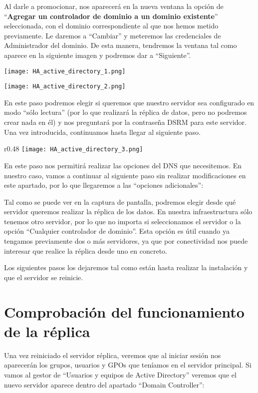 Al darle a promocionar, nos aparecerá en la nueva ventana la opción de “\textbf{Agregar un controlador de dominio a un dominio existente}” seleccionada, con el dominio correspondiente al que nos hemos metido previamente. Le daremos a “Cambiar” y meteremos las credenciales de Administrador del dominio. De esta manera, tendremos la ventana tal como aparece en la siguiente imagen y podremos dar a “Siguiente”.


{
    \begin{minipage}{0.48\linewidth}
        \texttt{[image: HA\_active\_directory\_1.png]}
    \end{minipage}
    \hfill
    \begin{minipage}{0.48\linewidth}
        \texttt{[image: HA\_active\_directory\_2.png]}
    \end{minipage}
    \vspace{1em}
}



En este paso podremos elegir si queremos que nuestro servidor sea configurado en modo “sólo lectura” (por lo que realizará la réplica de datos, pero no podremos crear nada en él) y nos preguntará por la contraseña DSRM para este servidor. Una vez introducida, continuamos hasta llegar al siguiente paso.

\begin{wrapfigure}{r}{0.48\linewidth}
    \centering
        \vspace{-10pt}
    \texttt{[image: HA\_active\_directory\_3.png]}
\end{wrapfigure}
En este paso nos permitirá realizar las opciones del DNS que necesitemos. En nuestro caso, vamos a continuar al siguiente paso sin realizar modificaciones en este apartado, por lo que llegaremos a las “opciones adicionales”:

Tal como se puede ver en la captura de pantalla, podremos elegir desde qué servidor queremos realizar la réplica de los datos. En nuestra infraestructura sólo tenemos otro servidor, por lo que no importa si seleccionamos el servidor o la opción “Cualquier controlador de dominio”. Esta opción es útil cuando ya tengamos previamente dos o más servidores, ya que por conectividad nos puede interesar que realice la réplica desde uno en concreto.

Los siguientes pasos los dejaremos tal como están hasta realizar la instalación y que el servidor se reinicie.

\section{Comprobación del funcionamiento de la réplica}
Una vez reiniciado el servidor réplica, veremos que al iniciar sesión nos aparecerán los grupos, usuarios y GPOs que teníamos en el servidor principal. Si vamos al gestor de “Usuarios y equipos de Active Directory” veremos que el nuevo servidor aparece dentro del apartado “Domain Controller”:

